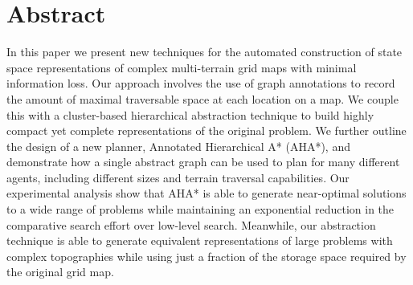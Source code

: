 \section{Abstract}
In this paper we present new techniques for the automated construction of state space representations of complex multi-terrain grid maps with minimal information loss. Our approach involves the use of graph annotations to record the amount of maximal traversable space at each location on a map. We couple this with a cluster-based hierarchical abstraction technique to build highly compact yet complete representations of the original problem. We further outline the design of a new planner, Annotated Hierarchical A* (AHA*), and demonstrate how a single abstract graph can be used to plan for many different agents, including different sizes and terrain traversal capabilities.
Our experimental analysis show that AHA* is able to generate near-optimal solutions to a wide range of problems while maintaining an exponential reduction in the comparative search effort over low-level search. Meanwhile, our abstraction technique is able to generate equivalent representations of large problems with complex topographies while using just a fraction of the storage space required by the original grid map.
